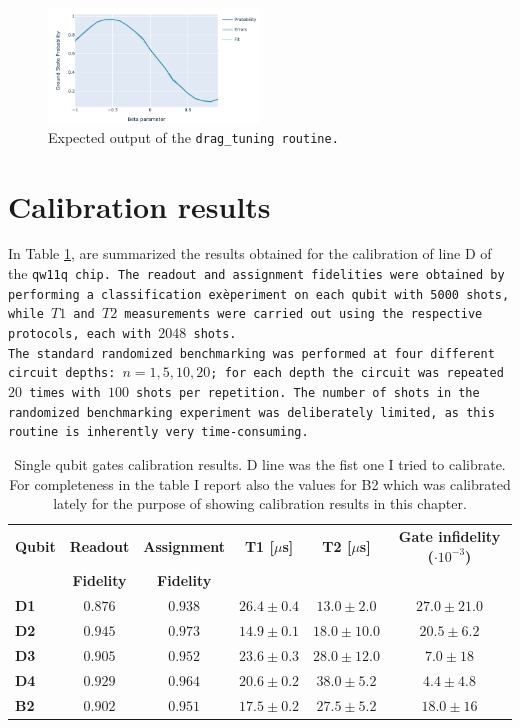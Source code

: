 \begin{figure}[h!]
    \centering
    \includegraphics[width=0.5\textwidth]{figures/png/drag_tuning.png}
    \caption{Expected output of the \tt{drag\_tuning} routine.}
    \label{fig:drag_tuning}
\end{figure}

\section{Calibration results}

In Table \ref{tab:cal_results}, are summarized the results obtained for the calibration of line D of the \tt{qw11q} chip. 
The readout and assignment fidelities were obtained by performing a classification exèperiment on each qubit with 5000 shots, while $T1$ and $T2$ measurements were carried out using the respective protocols, each with $2048$ shots.\\
The standard randomized benchmarking was performed at four different circuit depths: $n=1,5,10,20$; for each depth the circuit was repeated $20$ times with $100$ shots per repetition. 
The number of shots in the randomized benchmarking experiment was deliberately limited, as this routine is inherently very time-consuming.

\begin{table}[h]
    \centering
    \begin{tabular}{lccccc}
    \toprule
    \textbf{Qubit} & \multicolumn{1}{c}{\textbf{Readout}} & \multicolumn{1}{c}{\textbf{Assignment}} & \textbf{T1 [$\mu$s]} & \textbf{T2 [$\mu$s]} & \textbf{Gate infidelity ($\cdot 10^{-3}$)} \\
    \textbf{} & \textbf{Fidelity} & \textbf{Fidelity} & & & \\
    \midrule
    \textbf{D1} & $0.876$ & $0.938$ & $26.4 \pm 0.4$ & $13.0 \pm 2.0$ & $27.0 \pm 21.0$ \\
    \textbf{D2} & $0.945$ & $0.973$ & $14.9 \pm 0.1$ & $18.0 \pm 10.0$ & $20.5 \pm 6.2$ \\
    \textbf{D3} & $0.905$ & $0.952$ & $23.6 \pm 0.3$ & $28.0 \pm 12.0$ & $7.0 \pm 18$ \\
    \textbf{D4} & $0.929$ & $0.964$ & $20.6 \pm 0.2$ & $38.0 \pm 5.2$ & $4.4 \pm 4.8$ \\
    \textbf{B2} & $0.902$ & $0.951$ & $17.5 \pm 0.2$ & $27.5 \pm 5.2$ & $18.0 \pm 16$ \\
    \bottomrule
    \end{tabular}
    \caption{Single qubit gates calibration results. D line was the fist one I tried to calibrate.\\
    For completeness in the table I report also the values for B2 which was calibrated lately for the purpose of showing calibration results in this chapter.}
    \label{tab:cal_results}
\end{table}

